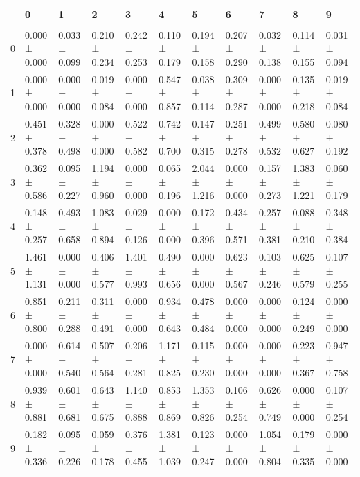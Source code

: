 \begingroup
\scriptsize
\setlength{\tabcolsep}{3pt}
\begin{tabular}{lllllllllll}
\toprule
 & \textbf{0} & \textbf{1} & \textbf{2} & \textbf{3} & \textbf{4} & \textbf{5} & \textbf{6} & \textbf{7} & \textbf{8} & \textbf{9} \\
  &  &  &  &  &  &  &  &  &  &  \\
\midrule
0 & 0.000 ± 0.000 & 0.033 ± 0.099 & 0.210 ± 0.234 & 0.242 ± 0.253 & 0.110 ± 0.179 & 0.194 ± 0.158 & 0.207 ± 0.290 & 0.032 ± 0.138 & 0.114 ± 0.155 & 0.031 ± 0.094 \\
1 & 0.000 ± 0.000 & 0.000 ± 0.000 & 0.019 ± 0.084 & 0.000 ± 0.000 & 0.547 ± 0.857 & 0.038 ± 0.114 & 0.309 ± 0.287 & 0.000 ± 0.000 & 0.135 ± 0.218 & 0.019 ± 0.084 \\
2 & 0.451 ± 0.378 & 0.328 ± 0.498 & 0.000 ± 0.000 & 0.522 ± 0.582 & 0.742 ± 0.700 & 0.147 ± 0.315 & 0.251 ± 0.278 & 0.499 ± 0.532 & 0.580 ± 0.627 & 0.080 ± 0.192 \\
3 & 0.362 ± 0.586 & 0.095 ± 0.227 & 1.194 ± 0.960 & 0.000 ± 0.000 & 0.065 ± 0.196 & 2.044 ± 1.216 & 0.000 ± 0.000 & 0.157 ± 0.273 & 1.383 ± 1.221 & 0.060 ± 0.179 \\
4 & 0.148 ± 0.257 & 0.493 ± 0.658 & 1.083 ± 0.894 & 0.029 ± 0.126 & 0.000 ± 0.000 & 0.172 ± 0.396 & 0.434 ± 0.571 & 0.257 ± 0.381 & 0.088 ± 0.210 & 0.348 ± 0.384 \\
5 & 1.461 ± 1.131 & 0.000 ± 0.000 & 0.406 ± 0.577 & 1.401 ± 0.993 & 0.490 ± 0.656 & 0.000 ± 0.000 & 0.623 ± 0.567 & 0.103 ± 0.246 & 0.625 ± 0.579 & 0.107 ± 0.255 \\
6 & 0.851 ± 0.800 & 0.211 ± 0.288 & 0.311 ± 0.491 & 0.000 ± 0.000 & 0.934 ± 0.643 & 0.478 ± 0.484 & 0.000 ± 0.000 & 0.000 ± 0.000 & 0.124 ± 0.249 & 0.000 ± 0.000 \\
7 & 0.000 ± 0.000 & 0.614 ± 0.540 & 0.507 ± 0.564 & 0.206 ± 0.281 & 1.171 ± 0.825 & 0.115 ± 0.230 & 0.000 ± 0.000 & 0.000 ± 0.000 & 0.223 ± 0.367 & 0.947 ± 0.758 \\
8 & 0.939 ± 0.881 & 0.601 ± 0.681 & 0.643 ± 0.675 & 1.140 ± 0.888 & 0.853 ± 0.869 & 1.353 ± 0.826 & 0.106 ± 0.254 & 0.626 ± 0.749 & 0.000 ± 0.000 & 0.107 ± 0.254 \\
9 & 0.182 ± 0.336 & 0.095 ± 0.226 & 0.059 ± 0.178 & 0.376 ± 0.455 & 1.381 ± 1.039 & 0.123 ± 0.247 & 0.000 ± 0.000 & 1.054 ± 0.804 & 0.179 ± 0.335 & 0.000 ± 0.000 \\
\bottomrule
\end{tabular}

\endgroup
